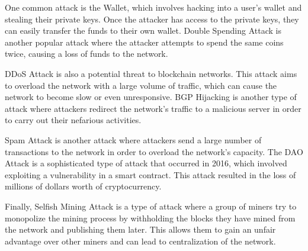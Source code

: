 One common attack is the \ac{Wallet}, which involves hacking into a user's wallet and stealing their private keys. Once the attacker has access to the private keys, they can easily transfer the funds to their own wallet. \ac{Double Spending} Attack is another popular attack where the attacker attempts to spend the same coins twice, causing a loss of funds to the network.

\ac{DDoS} Attack is also a potential threat to blockchain networks. This attack aims to overload the network with a large volume of traffic, which can cause the network to become slow or even unresponsive. \ac{BGP} Hijacking is another type of attack where attackers redirect the network's traffic to a malicious server in order to carry out their nefarious activities.

\ac{Spam} Attack is another attack where attackers send a large number of transactions to the network in order to overload the network's capacity. The \ac{DAO} Attack is a sophisticated type of attack that occurred in 2016, which involved exploiting a vulnerability in a smart contract. This attack resulted in the loss of millions of dollars worth of cryptocurrency.

Finally, \ac{Selfish Mining} Attack is a type of attack where a group of miners try to monopolize the mining process by withholding the blocks they have mined from the network and publishing them later. This allows them to gain an unfair advantage over other miners and can lead to centralization of the network.

